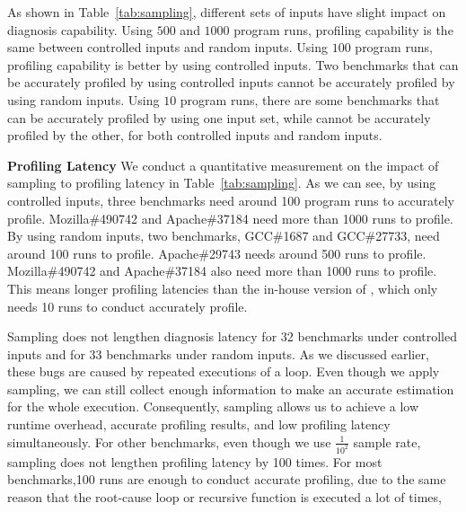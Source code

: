 As shown in Table~\ref{tab:sampling}, 
different sets of inputs have slight impact on diagnosis capability. 
Using $500$ and $1000$ program runs, 
profiling capability is the same between controlled inputs and random inputs. 
Using $100$ program runs, 
profiling capability is better by using controlled inputs.
Two benchmarks that can be accurately profiled by using controlled inputs 
cannot be accurately profiled by using random inputs.
Using $10$ program runs, 
there are some benchmarks that can be accurately 
profiled by using one input set, while cannot 
be accurately profiled by the other, 
for both controlled inputs and random inputs.





\noindent\textbf{Profiling Latency}
We conduct a quantitative measurement on the impact of sampling to profiling latency 
in Table~\ref{tab:sampling}.
As we can see, by using controlled inputs, 
three benchmarks need around 100 program runs to accurately profile. 
Mozilla\#490742 and Apache\#37184 need more than 1000 runs to profile. 
By using random inputs, two benchmarks, GCC\#1687 and GCC\#27733, 
need around 100 runs to profile. 
Apache\#29743 needs around 500 runs to profile. 
Mozilla\#490742 and Apache\#37184 also need more than 1000 runs to profile.   
This means longer profiling latencies than the in-house version of \Tool,
which only needs 10 runs to conduct accurately profile. 

Sampling does not lengthen diagnosis latency for 32 benchmarks 
under controlled 
inputs and for 33 benchmarks under random inputs.
As we discussed earlier, these bugs are caused by repeated executions of a loop. 
Even though we apply sampling, 
we can still collect enough information to make an accurate estimation for the whole execution. 
Consequently, sampling allows us to achieve a low runtime overhead, 
accurate profiling results, and low profiling latency simultaneously. 
For other benchmarks, even though we use $\frac{1}{10^2}$ sample rate, 
sampling does not lengthen profiling latency by 100 times. 
For most benchmarks,100 runs are enough to conduct accurate profiling, 
due to the same reason that the root-cause loop or recursive function is executed a lot of times, 


















%
%





